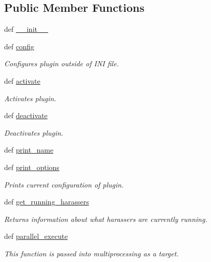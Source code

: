 \subsection*{Public Member Functions}
\begin{DoxyCompactItemize}
\item 
def \hyperlink{class_harasser_1_1_harasser_a2be9f5195e1163d8d7504545ecce5392}{\-\_\-\-\_\-init\-\_\-\-\_\-}
\item 
def \hyperlink{class_harasser_1_1_harasser_a1c6d6c9fd9c045fda3739fc492529f8a}{config}
\begin{DoxyCompactList}\small\item\em Configures plugin outside of I\-N\-I file. \end{DoxyCompactList}\item 
def \hyperlink{class_harasser_1_1_harasser_a640d9b23c457a325faf5b907eb5bdc45}{activate}
\begin{DoxyCompactList}\small\item\em Activates plugin. \end{DoxyCompactList}\item 
def \hyperlink{class_harasser_1_1_harasser_a2a588949b62a2b366f37994e71fb2fb1}{deactivate}
\begin{DoxyCompactList}\small\item\em Deactivates plugin. \end{DoxyCompactList}\item 
def \hyperlink{class_harasser_1_1_harasser_a5b5cb263e3c62a9de749cd0424262703}{print\-\_\-name}
\item 
def \hyperlink{class_harasser_1_1_harasser_a732567c8a1913fca8ff1ca0c65b0540b}{print\-\_\-options}
\begin{DoxyCompactList}\small\item\em Prints current configuration of plugin. \end{DoxyCompactList}\item 
def \hyperlink{class_harasser_1_1_harasser_ad128bc111a91fd099e6f20db5320ca36}{get\-\_\-running\-\_\-harassers}
\begin{DoxyCompactList}\small\item\em Returns information about what harassers are currently running. \end{DoxyCompactList}\item 
def \hyperlink{class_harasser_1_1_harasser_a02afcd1243832ad692db3ecbf8b83950}{parallel\-\_\-execute}
\begin{DoxyCompactList}\small\item\em This function is passed into multiprocessing as a target. \end{DoxyCompactList}\item 

\end{DoxyCompactItemize}
